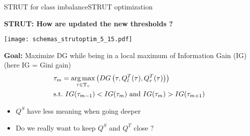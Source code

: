 
\begin{frame}{STRUT for class imbalance}{STRUT optimization}
\begin{minipage}[t]{0.4\linewidth}
    \vspace{0pt}
    \centering
    \textbf{STRUT: How are updated the new thresholds ?}\\
    \renewcommand{\ratio}{1.0}
    \begin{overprint}
        \texttt{[image: schemas\_strutoptim\_5\_15.pdf]}
    \end{overprint}
\end{minipage}\hfill
\begin{minipage}[t]{0.55\linewidth}
    \vspace{0pt}
    
    \textbf{Goal: } Maximize DG while being in a local maximum of Information Gain (IG) (here IG = Gini gain)
    \begin{align*}
        &\tau_{m} = \operatorname*{arg\,max}_{\tau \in \mathrm{T}_{v}}\left(DG\left(  \tau ,  Q_{l}^{T}(\tau), Q_{r}^{T}(\tau)\right)\right) \\
        &\text{s.t.\ } IG(\tau_{m-1}) < IG(\tau_{m}) \text{ and } IG(\tau_{m}) > IG(\tau_{m+1})
    \end{align*}
    \vspace{1cm}

    \pause
    \begin{itemize}
        \item  $Q^S$ have less meaning when going deeper
        \item  Do we really want to keep $Q^S$ and $Q^T$ close ?
    \end{itemize}
\end{minipage}

\end{frame}

